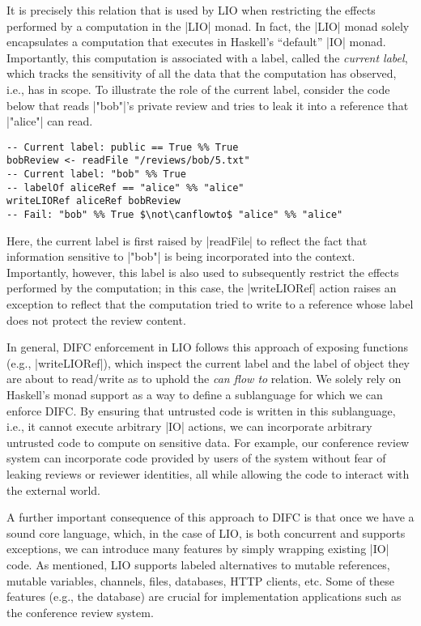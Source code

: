 It is precisely this relation that is used by LIO when restricting the
effects performed by a computation in the \hs|LIO| monad.
%
In fact, the \hs|LIO| monad solely encapsulates a computation that
executes in Haskell's ``default'' \hs|IO| monad.
%
Importantly, this computation is associated with a label, called the
\emph{current label}, which tracks the sensitivity of all the data
that the computation has observed, i.e., has in scope.
%
To illustrate the role of the current label, consider the code below
that reads \hs|"bob"|'s private review and tries to leak it into a
reference that \hs|"alice"| can read.
\begin{verbatim}
-- Current label: public == True %% True
bobReview <- readFile "/reviews/bob/5.txt"
-- Current label: "bob" %% True
-- labelOf aliceRef == "alice" %% "alice"
writeLIORef aliceRef bobReview
-- Fail: "bob" %% True $\not\canflowto$ "alice" %% "alice"
\end{verbatim}
%
Here, the current label is first raised by \hs|readFile| to reflect
the fact that information sensitive to \hs|"bob"| is being
incorporated into the context.
%
Importantly, however, this label is also used to subsequently restrict
the effects performed by the computation; in this case, the
\hs|writeLIORef| action raises an exception to reflect that
the computation tried to write to a reference whose label
does not protect the review content.

In general, DIFC enforcement in LIO follows this approach of exposing
functions (e.g., \hs|writeLIORef|), which inspect the current label
and the label of object they are about to read/write as to uphold the
\emph{can flow to} relation.
%
We solely rely on Haskell's monad support as a way to define a
sublanguage for which we can enforce DIFC.
%
By ensuring that untrusted code is written in this sublanguage, i.e.,
it cannot execute arbitrary \hs|IO| actions, we can incorporate
arbitrary untrusted code to compute on sensitive data.
%
For example, our conference review system can incorporate code
provided by users of the system without fear of leaking reviews or
reviewer identities, all while allowing the code to interact with the
external world.

A further important consequence of this approach to DIFC is that once
we have a sound core language, which, in the case of LIO, is both
concurrent and supports exceptions,
we can introduce many features by simply wrapping existing \hs|IO|
code.
%
As mentioned, LIO supports labeled alternatives to mutable references,
mutable variables, channels, files, databases, HTTP clients, etc.
%
Some of these features (e.g., the database) are crucial for
implementation applications such as the conference review system.

